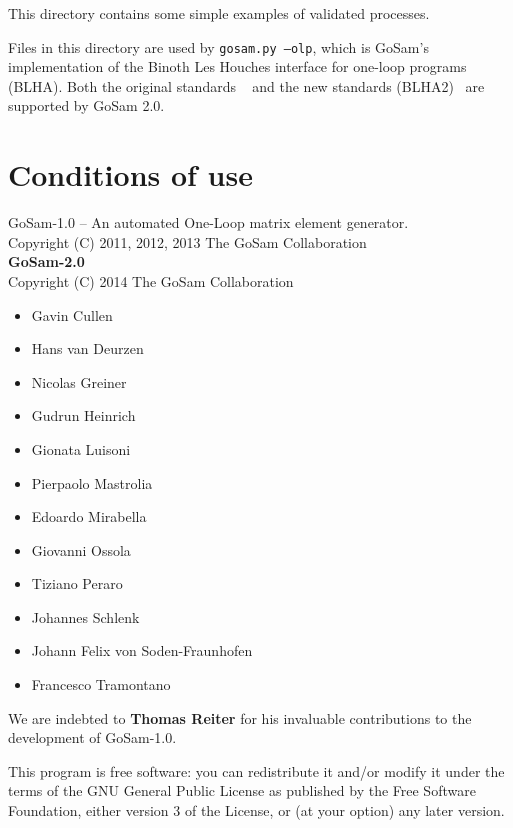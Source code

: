 \documentclass[11pt,a4paper]{refrep}
\newcommand{\gosamversion}{{2{.}0}}
\newcommand{\gosamv}[1][\gosamversion]{{\sc GoSam}\xspace}
\begin{document}
 This directory contains some simple examples
of validated processes.

 Files in this directory are used by
\texttt{gosam.py --olp}, which is \gosamv's implementation of the
Binoth Les Houches interface for one-loop programs (BLHA).
Both the original standards ~\cite{Binoth:2010xt} and the new standards 
(BLHA2)~\cite{Alioli:2013nda} are supported by \gosamv2.0.



\chapter*{Conditions of use}
    GoSam-1.0 -- An automated One-Loop matrix element generator.\\
    Copyright (C) 2011, 2012, 2013  The GoSam Collaboration\\
    
    {\bf GoSam-2.0}  \\
    Copyright (C) 2014  The GoSam Collaboration
     \begin{itemize}               
                \item Gavin Cullen
		\item Hans van Deurzen
                \item Nicolas Greiner
                \item Gudrun Heinrich
                \item Gionata Luisoni
                \item Pierpaolo Mastrolia
		\item Edoardo Mirabella
                \item Giovanni Ossola
		\item Tiziano Peraro
		\item Johannes Schlenk
		\item Johann Felix von Soden-Fraunhofen
                \item Francesco Tramontano
    \end{itemize}
   
    We are indebted to {\bf Thomas Reiter} for his invaluable contributions 
    to the development of GoSam-1.0.

    This program is free software: you can redistribute it and/or modify
    it under the terms of the GNU General Public License as published by
    the Free Software Foundation, either version 3 of the License, or
    (at your option) any later version.
\end{document}
